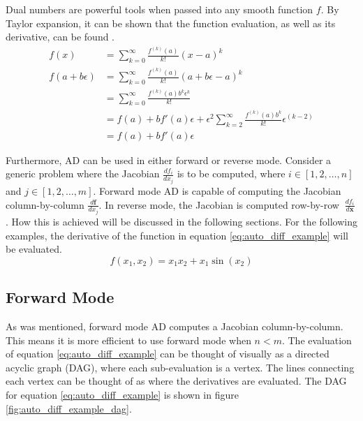 Dual numbers are powerful tools when passed into any smooth function $f$. By Taylor expansion, it can be shown that the function evaluation, as well as its derivative, can be found \cite{Kochenderfer_Wheeler_2019}. 
\begin{equation}
	\begin{split}
		f(x) &= \sum_{k=0}^\infty \frac{f^{(k)}(a)}{k!}(x-a)^k \\
		f(a+b\epsilon) &= \sum_{k=0}^\infty \frac{f^{(k)}(a)}{k!}(a+b\epsilon-a)^k \\
		&= \sum_{k=0}^\infty \frac{f^{(k)}(a)b^k\epsilon^k}{k!} \\
		&= f(a) + bf'(a)\epsilon + \epsilon^2\sum_{k=2}^\infty \frac{f^{(k)}(a)b^k}{k!}\epsilon^{(k-2)} \\
		&= f(a) + bf'(a)\epsilon
	\end{split}
	\label{eq:dual_taylor_expansion}
\end{equation}

Furthermore, AD can be used in either forward or reverse mode. Consider a generic problem where the Jacobian $\frac{df_i}{dx_j}$ is to be computed, where $i\in[1,2,\dots,n]$ and $j\in[1,2,\dots,m]$. Forward mode AD is capable of computing the Jacobian column-by-column $\frac{d\mathbf{f}}{dx_j}$. In reverse mode, the Jacobian is computed row-by-row $\ \frac{df_i}{d\mathbf{x}}$. How this is achieved will be discussed in the following sections. For the following examples, the derivative of the function in equation \ref{eq:auto_diff_example} will be evaluated. 
\begin{equation}
	f(x_1,x_2) = x_1x_2 + x_1\sin(x_2)
	\label{eq:auto_diff_example}
\end{equation}

\subsection*{Forward Mode}
As was mentioned, forward mode AD computes a Jacobian column-by-column. This means it is more efficient to use forward mode when $n < m$. The evaluation of equation \ref{eq:auto_diff_example} can be thought of visually as a directed acyclic graph (DAG), where each sub-evaluation is a vertex. The lines connecting each vertex can be thought of as where the derivatives are evaluated. The DAG for equation \ref{eq:auto_diff_example} is shown in figure \ref{fig:auto_diff_example_dag}.

